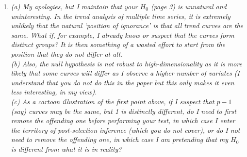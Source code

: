 \documentclass[a4paper,12pt]{article}
\begin{document}
\begin{enumerate}[label=\arabic*.,leftmargin=0.6cm]


\item {\color{black}\textit{(a) My apologies, but I maintain that your $H_0$ (page 3) is unnatural and uninteresting. In the trend analysis of multiple time series, it is extremely unlikely that the natural ‘position of ignorance’ is that all trend curves are the same. What if, for example, I already know or suspect that the curves form distinct groups? It is then something of a wasted effort to start from the position that they do not differ at all. \\
(b) Also, the null hypothesis is not robust to high-dimensionality as it is more likely that some curves will differ as I observe a higher number of variates (I understand that you do not do this in the paper but this only makes it even less interesting, in my view). \\
(c) As a cartoon illustration of the first point above, if I suspect that $p-1$ (say) curves may be the same, but 1 is distinctly different, do I need to first remove the offending one before performing your test, in which case I enter the territory of post-selection inference (which you do not cover), or do I not need to remove the offending one, in which case I am pretending that my $H_0$ is different from what it is in reality?}}


\end{enumerate}
\end{document}
